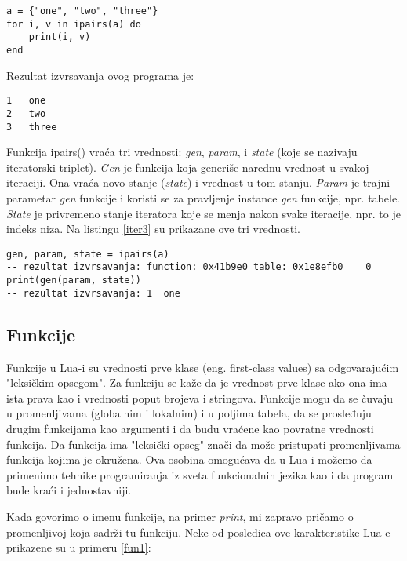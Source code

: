 \documentclass[a4paper]{article}
\begin{document}
\begin{lstlisting}[caption={Primer iteratora bez stanja},frame=single, label=iter2]
a = {"one", "two", "three"}
for i, v in ipairs(a) do
	print(i, v)
end
\end{lstlisting}
Rezultat izvrsavanja ovog programa je:
\begin{verbatim}
1	one
2	two
3	three
\end{verbatim}
Funkcija ipairs() vraća tri vrednosti: \textit{gen}, \textit{param}, i \textit{state} (koje se nazivaju iteratorski triplet). \textit{Gen} je funkcija koja generiše narednu vrednost u svakoj iteraciji. Ona vraća novo stanje (\textit{state}) i vrednost u tom stanju. \textit{Param} je trajni parametar \textit{gen} funkcije i koristi se za pravljenje instance \textit{gen} funkcije, npr. tabele. \textit{State} je privremeno stanje iteratora koje se menja nakon svake iteracije, npr. to je indeks niza\cite{luafun}. Na listingu \ref{iter3} su prikazane ove tri vrednosti.
\begin{lstlisting}[caption={Primer iteratora bez stanja (nastavak)},frame=single, label=iter3]
gen, param, state = ipairs(a)
-- rezultat izvrsavanja: function: 0x41b9e0	table: 0x1e8efb0	0
print(gen(param, state))
-- rezultat izvrsavanja: 1	one
\end{lstlisting}


\subsection*{Funkcije}
Funkcije u Lua-i su vrednosti prve klase (eng. first-class values) sa odgovarajućim "leksičkim opsegom". Za funkciju se kaže da je vrednost prve klase ako ona ima ista prava kao i vrednosti poput brojeva i stringova. Funkcije mogu da se čuvaju u promenljivama (globalnim i lokalnim) i u poljima tabela, da se prosleđuju drugim funkcijama kao argumenti i da budu vraćene kao povratne vrednosti funkcija. Da funkcija ima "leksički opseg" znači da može pristupati promenljivama funkcija kojima je okružena. Ova osobina omogućava da u Lua-i možemo da primenimo tehnike programiranja iz sveta funkcionalnih jezika kao i da program bude kraći i jednostavniji.

Kada govorimo o imenu funkcije, na primer \textit{print}, mi zapravo pričamo o promenljivoj koja sadrži tu funkciju. Neke od posledica ove karakteristike Lua-e prikazene su u primeru \ref{fun1}:
\end{document}
